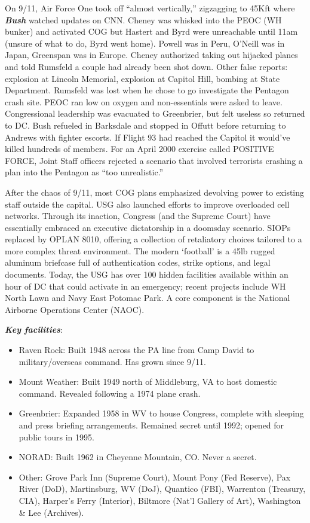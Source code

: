 \documentclass[
]{article}
\begin{document}
On 9/11, Air Force One took off ``almost vertically,'' zigzagging to
45Kft where \textbf{\emph{Bush}} watched updates on CNN. Cheney was
whisked into the PEOC (WH bunker) and activated COG but Hastert and Byrd
were unreachable until 11am (unsure of what to do, Byrd went home).
Powell was in Peru, O'Neill was in Japan, Greenspan was in Europe.
Cheney authorized taking out hijacked planes and told Rumsfeld a couple
had already been shot down. Other false reports: explosion at Lincoln
Memorial, explosion at Capitol Hill, bombing at State Department.
Rumsfeld was lost when he chose to go investigate the Pentagon crash
site. PEOC ran low on oxygen and non-essentials were asked to leave.
Congressional leadership was evacuated to Greenbrier, but felt useless
so returned to DC. Bush refueled in Barksdale and stopped in Offutt
before returning to Andrews with fighter escorts. If Flight 93 had
reached the Capitol it would've killed hundreds of members. For an April
2000 exercise called POSITIVE FORCE, Joint Staff officers rejected a
scenario that involved terrorists crashing a plan into the Pentagon as
``too unrealistic.''

After the chaos of 9/11, most COG plans emphasized devolving power to
existing staff outside the capital. USG also launched efforts to improve
overloaded cell networks. Through its inaction, Congress (and the
Supreme Court) have essentially embraced an executive dictatorship in a
doomsday scenario. SIOPs replaced by OPLAN 8010, offering a collection
of retaliatory choices tailored to a more complex threat environment.
The modern `football' is a 45lb rugged aluminum briefcase full of
authentication codes, strike options, and legal documents. Today, the
USG has over 100 hidden facilities available within an hour of DC that
could activate in an emergency; recent projects include WH North Lawn
and Navy East Potomac Park. A core component is the National Airborne
Operations Center (NAOC).

\textbf{\emph{Key facilities}}:

\begin{itemize}
\item
  Raven Rock: Built 1948 across the PA line from Camp David to
  military/overseas command. Has grown since 9/11.
\item
  Mount Weather: Built 1949 north of Middleburg, VA to host domestic
  command. Revealed following a 1974 plane crash.
\item
  Greenbrier: Expanded 1958 in WV to house Congress, complete with
  sleeping and press briefing arrangements. Remained secret until 1992;
  opened for public tours in 1995.
\item
  NORAD: Built 1962 in Cheyenne Mountain, CO. Never a secret.
\item
  Other: Grove Park Inn (Supreme Court), Mount Pony (Fed Reserve), Pax
  River (DoD), Martinsburg, WV (DoJ), Quantico (FBI), Warrenton
  (Treasury, CIA), Harper's Ferry (Interior), Biltmore (Nat'l Gallery of
  Art), Washington \& Lee (Archives).
\end{itemize}
\end{document}
